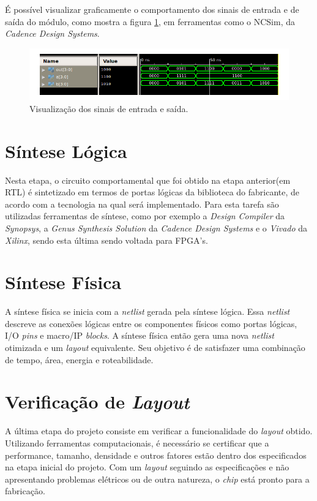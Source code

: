 É possível visualizar graficamente o comportamento dos sinais de entrada e de saída do módulo, como mostra a figura \ref{tests}, em ferramentas como o NCSim, da \textit{Cadence Design Systems}.

\begin{figure}[ht!]
  \centering
  \includegraphics[width=\textwidth]{figuras/testsig.PNG}
  \caption{Visualização dos sinais de entrada e saída.}
  \label{tests}
\end{figure}

\section{Síntese Lógica}

Nesta etapa, o circuito comportamental que foi obtido na etapa anterior(em RTL) é sintetizado em termos de portas lógicas da biblioteca do fabricante, de acordo com a tecnologia na qual será implementado. Para esta tarefa são utilizadas ferramentas de síntese, como por exemplo a \textit{Design Compiler} da \textit{Synopsys}, a \textit{Genus Synthesis Solution} da \textit{Cadence Design Systems} e o \textit{Vivado} da \textit{Xilinx}, sendo esta última sendo voltada para FPGA's.

\section{Síntese Física}

A síntese física se inicia com a \textit{netlist} gerada pela síntese lógica. Essa \textit{netlist} descreve as conexões lógicas entre os componentes físicos como portas lógicas, I/O \textit{pins} e macro/IP \textit{blocks}. A síntese física então gera uma nova \textit{netlist} otimizada e um \textit{layout} equivalente. Seu objetivo é de satisfazer uma combinação de tempo, área, energia e roteabilidade.\cite{phy}

\section{Verificação de\textit{ Layout}}

A última etapa do projeto consiste em verificar a funcionalidade do \textit{layout} obtido.  Utilizando ferramentas computacionais, é necessário se certificar que a performance, tamanho, densidade e outros fatores estão dentro dos especificados na etapa inicial do projeto. Com um \textit{layout} seguindo as especificações e não apresentando problemas elétricos ou de outra natureza, o \textit{chip} está pronto para a fabricação.